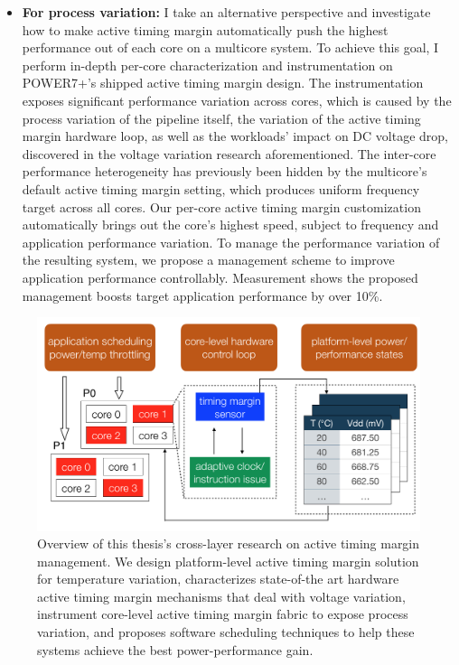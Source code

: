 \begin{itemize}
\item \textbf{For process variation:} I take an alternative perspective and investigate how to make active timing margin automatically push the highest performance out of each core on a multicore system. To achieve this goal, I perform in-depth per-core characterization and instrumentation on POWER7+'s shipped active timing margin design. The instrumentation exposes significant performance variation across cores, which is caused by the process variation of the pipeline itself, the variation of the active timing margin hardware loop, as well as the workloads' impact on DC voltage drop, discovered in the voltage variation research aforementioned. The inter-core performance heterogeneity has previously been hidden by the multicore's default active timing margin setting, which produces
uniform frequency target across all cores. Our per-core active timing margin customization automatically brings out the core's highest speed, subject to frequency and application performance variation. To manage the performance variation of the resulting system, we propose a management scheme to improve application performance controllably. Measurement shows the proposed management boosts target application performance by over 10\%.

\end{itemize}

\begin{figure}
  \centering
  \includegraphics[trim=0 0 0 0, clip, width=\columnwidth]{graphs/intro/sys-overview.png}
  \caption{Overview of this thesis's cross-layer research on active timing margin management. We design platform-level active timing margin solution for temperature variation, characterizes state-of-the art hardware active timing margin mechanisms that deal with voltage variation, instrument core-level active timing margin fabric to expose process variation, and proposes software scheduling techniques to help these systems achieve the best power-performance gain.}
  \label{fig:framework}
\end{figure}

